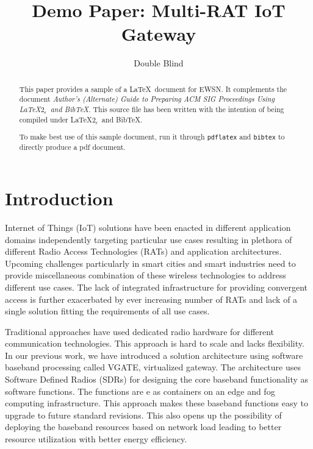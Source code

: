 \documentclass[10pt,emptycopyrightspace]{ewsn-proc}
\author{
\alignauthor Double Blind \\
  \affaddr{do not reveal authors}
}
\title{Demo Paper: Multi-RAT IoT Gateway}
\begin{document}
\maketitle

\begin{abstract}


This paper provides a sample of a \LaTeX\ document for EWSN. 
It complements the document \textit{Author's (Alternate) Guide to
Preparing ACM SIG Proceedings Using \LaTeX$2_\epsilon$\ and Bib\TeX}.
This source file has been written with the intention of being
compiled under \LaTeX$2_\epsilon$\ and BibTeX.

To make best use of this sample document, run it through \texttt{pdflatex}
and \texttt{bibtex} to directly produce a pdf document.
\end{abstract}

%
%

%

\section{Introduction}
  \label{sec:intro}
Internet of Things (IoT) solutions have been enacted in different application domains independently targeting particular use cases resulting in plethora of different Radio Access Technologies (RATs) and application architectures. Upcoming challenges particularly in smart cities and smart industries need to provide miscellaneous combination of these wireless technologies to address different use cases. The lack of integrated infrastructure for providing convergent access is further exacerbated by ever increasing number of RATs and lack of a single solution fitting the requirements of all use cases. 


Traditional approaches have used dedicated radio hardware for different communication technologies. This approach is hard to scale and lacks flexibility. In our previous work, we have introduced a solution architecture using software baseband processing called VGATE, virtualized gateway. The architecture uses Software Defined Radios (SDRs) for designing the core baseband functionality as software functions. The functions are e as containers on an edge and fog computing infrastructure. This approach makes these baseband functions easy to upgrade to future standard revisions.  This also opens up the possibility of deploying the baseband resources based on network load leading to better resource utilization with better energy efficiency.
\end{document}
